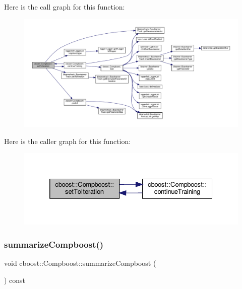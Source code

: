 Here is the call graph for this function\+:
\nopagebreak
\begin{figure}[H]
\begin{center}
\leavevmode
\includegraphics[width=350pt]{classcboost_1_1_compboost_ad1ee3b88f585f38255d827dceb4b7659_cgraph}
\end{center}
\end{figure}
Here is the caller graph for this function\+:
\nopagebreak
\begin{figure}[H]
\begin{center}
\leavevmode
\includegraphics[width=332pt]{classcboost_1_1_compboost_ad1ee3b88f585f38255d827dceb4b7659_icgraph}
\end{center}
\end{figure}
\mbox{\label{classcboost_1_1_compboost_a7be8cb767054ece895d535c1f468233e}} 
\subsubsection{\texorpdfstring{summarize\+Compboost()}{summarizeCompboost()}}
{\footnotesize\ttfamily void cboost\+::\+Compboost\+::summarize\+Compboost (\begin{DoxyParamCaption}{ }\end{DoxyParamCaption}) const}


